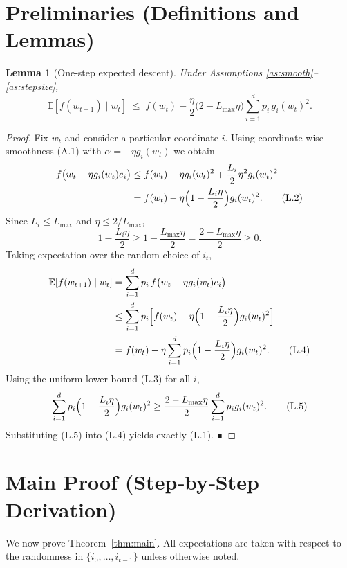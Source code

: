 \documentclass{article}
\newtheorem{lemma}{Lemma}
\newcommand{\EE}{\mathbb{E}}
\begin{document}
\section*{Preliminaries (Definitions and Lemmas)}
\begin{lemma}[One‑step expected descent]\label{lem:descent}
Under Assumptions \ref{as:smooth}–\ref{as:stepsize},
\[
\EE\!\left[f(w_{t+1})\mid w_t\right]
\;\le\;
f(w_t)-\frac{\eta}{2}\bigl(2-L_{\max}\eta\bigr)
\sum_{i=1}^{d}p_i\,g_i(w_t)^{2}.
\tag{L.1}
\]
\end{lemma}
\begin{proof}
Fix $w_t$ and consider a particular coordinate $i$.
Using coordinate‑wise smoothness (A.1) with $\alpha=-\eta g_i(w_t)$ we obtain
\begin{align}
f\bigl(w_t-\eta g_i(w_t)e_i\bigr)
&\le f(w_t)-\eta g_i(w_t)^{2}
   +\frac{L_i}{2}\eta^{2}g_i(w_t)^{2} \nonumber\\
&= f(w_t)-\eta\Bigl(1-\frac{L_i\eta}{2}\Bigr)g_i(w_t)^{2}.
\tag{L.2}
\end{align}
Since $L_i\le L_{\max}$ and $\eta\le 2/L_{\max}$,
\[
1-\frac{L_i\eta}{2}\ge 1-\frac{L_{\max}\eta}{2}
=\frac{2-L_{\max}\eta}{2}\ge0 .
\tag{L.3}
\]
Taking expectation over the random choice of $i_t$,
\begin{align}
\EE\!\left[f(w_{t+1})\mid w_t\right]
&=\sum_{i=1}^{d}p_i\,f\bigl(w_t-\eta g_i(w_t)e_i\bigr) \nonumber\\
&\le\sum_{i=1}^{d}p_i\Bigl[f(w_t)-\eta\Bigl(1-\frac{L_i\eta}{2}\Bigr)g_i(w_t)^{2}\Bigr] \nonumber\\
&= f(w_t)-\eta\sum_{i=1}^{d}p_i\Bigl(1-\frac{L_i\eta}{2}\Bigr)g_i(w_t)^{2}.
\tag{L.4}
\end{align}
Using the uniform lower bound (L.3) for all $i$,
\[
\sum_{i=1}^{d}p_i\Bigl(1-\frac{L_i\eta}{2}\Bigr)g_i(w_t)^{2}
\ge \frac{2-L_{\max}\eta}{2}\sum_{i=1}^{d}p_i g_i(w_t)^{2}.
\tag{L.5}
\]
Substituting (L.5) into (L.4) yields exactly (L.1).  ∎
\end{proof}

\section*{Main Proof (Step‑by‑Step Derivation)}
We now prove Theorem~\ref{thm:main}.  All expectations are taken with respect to the
randomness in $\{i_0,\dots,i_{t-1}\}$ unless otherwise noted.
\end{document}
